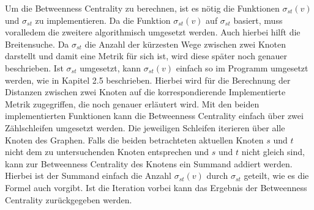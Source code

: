 \documentclass[a4paper,12pt,ngerman,chapterprefix=false,listof=totoc,bibliography=totoc]{scrreprt}
\begin{document}
{{{Um die Betweenness Centrality zu berechnen, ist es nötig die Funktionen \(\sigma_{st}(v)\) und \(\sigma_{st}\) zu implementieren. Da die Funktion \(\sigma_{st}(v)\) auf \(\sigma_{st}\) basiert, muss voralledem die zweitere algorithmisch umgesetzt werden. Auch hierbei hilft die Breitensuche. Da \(\sigma_{st}\) die Anzahl der kürzesten Wege zwischen zwei Knoten darstellt und damit eine Metrik für sich ist, wird diese später noch genauer beschrieben. Ist \(\sigma_{st}\) umgesetzt, kann \(\sigma_{st}(v)\) einfach so im Programm umgesetzt werden, wie in Kapitel 2.5 beschrieben. Hierbei wird für die Berechnung der Distanzen zwischen zwei Knoten auf die korrespondierende Implementierte Metrik zugegriffen, die noch genauer erläutert wird. Mit den beiden implementierten Funktionen kann die Betweenness Centrality einfach über zwei Zählschleifen umgesetzt werden. Die jeweiligen Schleifen iterieren über alle Knoten des Graphen. Falls die beiden betrachteten aktuellen Knoten \(s\) und \(t\) nicht dem zu untersuchenden Knoten entsprechen und \(s\) und \(t\) nicht gleich sind, kann zur Betweenness Centrality des Knotens ein Summand addiert werden. Hierbei ist der Summand einfach die Anzahl \(\sigma_{st}(v)\) durch \(\sigma_{st}\) geteilt, wie es die Formel auch vorgibt. Ist die Iteration vorbei kann das Ergebnis der Betweenness Centrality zurückgegeben werden.

}}}
\end{document}
